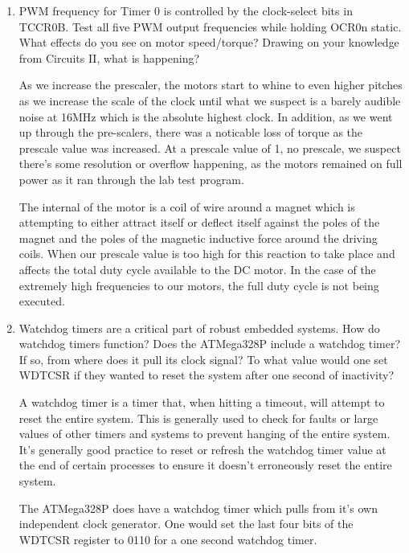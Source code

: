 \documentclass[letterpaper,11pt]{texMemo} %
\begin{document}
\begin{enumerate}
\item  PWM frequency for Timer 0 is controlled by the clock-select bits in TCCR0B. Test all five
PWM output frequencies while holding OCR0n static. What effects do you see on motor
speed/torque? Drawing on your knowledge from Circuits II, what is happening?

As we increase the prescaler, the motors start to whine to even higher pitches as we increase the scale
of the clock until what we suspect is a barely audible noise at 16MHz which is the absolute highest clock.
In addition, as we went up through the pre-scalers, there was a noticable loss of torque as the prescale value 
was increased. At a prescale value of 1, no prescale, we suspect there's some resolution or overflow happening, as 
the motors remained on full power as it ran through the lab test program.

The internal of the motor is a coil of wire around a magnet which is attempting to either attract itself 
or deflect itself against the poles of the magnet and the poles of the magnetic inductive force around the 
driving coils. When our prescale value is too high for this reaction to take place and affects the total duty
cycle available to the DC motor. In the case of the extremely high frequencies to our motors, the full duty 
cycle is not being executed.



\item  Watchdog timers are a critical part of robust embedded systems. How do watchdog timers
function? Does the ATMega328P include a watchdog timer? If so, from where does it pull
its clock signal? To what value would one set WDTCSR if they wanted to reset the system
after one second of inactivity?

A watchdog timer is a timer that, when hitting a timeout, will attempt to reset the entire 
system. This is generally used to check for faults or large values of other timers and systems 
to prevent hanging of the entire system. It's generally good practice to reset or refresh the watchdog 
timer value at the end of certain processes to ensure it doesn't erroneously reset the entire system.

The ATMega328P does have a watchdog timer which pulls from it's own independent clock generator. One 
would set the last four bits of the WDTCSR register to 0110 for a one second watchdog timer.


\end{enumerate} 
\end{document}
